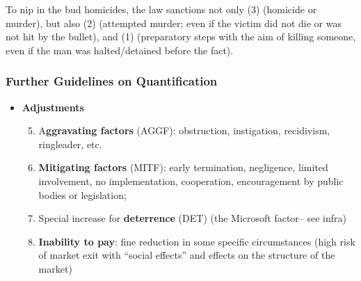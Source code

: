            To nip in the bud homicides, the law sanctions not only (3) (homicide or murder), but also (2) (attempted murder; even if the victim did not die or was not hit by the bullet), and (1) (preparatory steps with the aim of killing someone, even if the man was halted/detained before the fact).

        \subsubsection{Further Guidelines on Quantification}

            \begin{itemize}
                \item \textbf{Adjustments}
                    \begin{enumerate}
                    \setcounter{enumi}{4}
                        \item A\textbf{ggravating factors} (AGGF): obstruction, instigation, recidivism, ringleader, etc.
                        \item \textbf{Mitigating factors} (MITF): early termination, negligence, limited involvement, no implementation, cooperation, encouragement by public bodies or legislation;
                        \item Special increase for \textbf{deterrence} (DET) (the Microsoft factor– see infra)
                        \item \textbf{Inability to pay}: fine reduction in some specific circumstances (high risk of market exit with “social effects” and effects on the structure of the market)
                    \end{enumerate}
            \end{itemize}


